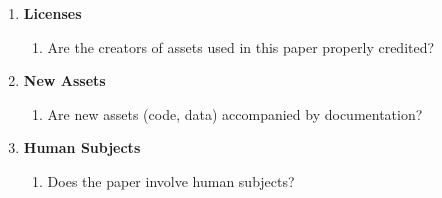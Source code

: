 \documentclass{article}
\begin{document}
\begin{enumerate}
\item {\bf Licenses}
    \begin{enumerate}
        \item Are the creators of assets used in this paper properly credited?
    \end{enumerate}

\item {\bf New Assets}
    \begin{enumerate}
        \item Are new assets (code, data) accompanied by documentation?
    \end{enumerate}

\item {\bf Human Subjects}
    \begin{enumerate}
        \item Does the paper involve human subjects?
        \answerNo{}
    \end{enumerate}

\end{enumerate}
\end{document}
